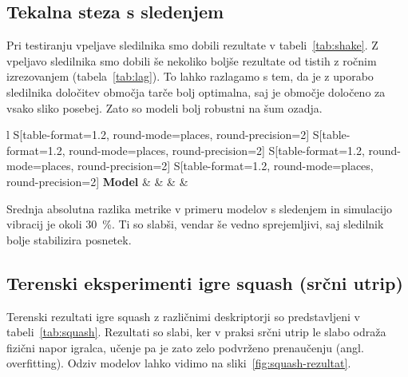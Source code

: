 \subsection{Tekalna steza s sledenjem}
Pri testiranju vpeljave sledilnika smo dobili rezultate v tabeli~\ref{tab:shake}. Z vpeljavo sledilnika smo dobili še nekoliko boljše rezultate od tistih z ročnim izrezovanjem (tabela~\ref{tab:lag}). To lahko razlagamo s tem, da je z uporabo sledilnika določitev območja tarče bolj optimalna, saj je območje določeno za vsako sliko posebej. Zato so modeli bolj robustni na šum ozadja.




\begin{table}[!htbp]
	\centering
	\begin{tabular}{l S[table-format=1.2, round-mode=places, round-precision=2] S[table-format=1.2, round-mode=places, round-precision=2] S[table-format=1.2, round-mode=places, round-precision=2] S[table-format=1.2, round-mode=places, round-precision=2]}
		\toprule
		\textbf{Model} & \thead{\corr} & \thead{\rae} & \thead{\rrse} & \theadm{\nsv}\\
		\midrule
		\bottomrule
	\end{tabular}
	\caption[Rezultati tekalne steze s sledenjem]{Rezultati tekalne steze s sledenjem. Pri modelih s končnico \textit{sh} smo uporabili simulacijo vibracij. Modeli \textit{tr} so brez vibracij.}
	\label{tab:shake}
\end{table}


Srednja absolutna razlika metrike \rrse v primeru modelov s sledenjem in simulacijo vibracij je okoli \SI{30}{\%}. Ti so slabši, vendar še vedno sprejemljivi, saj sledilnik bolje stabilizira posnetek.











\subsection{Terenski eksperimenti igre squash (srčni utrip)}
Terenski rezultati igre squash z različnimi deskriptorji so predstavljeni v tabeli~\ref{tab:squash}.  Rezultati so slabi, ker v praksi srčni utrip le slabo odraža fizični napor igralca, učenje pa je zato zelo podvrženo prenaučenju (angl. overfitting). Odziv modelov lahko vidimo na sliki~\ref{fig:squash-rezultat}.

